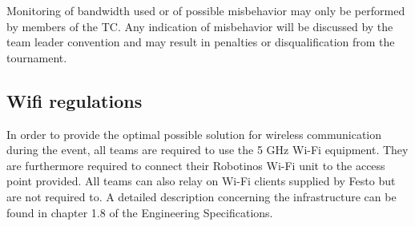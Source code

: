 \documentclass[12pt,twoside]{article}
\newenvironment{rulechange}{}{}
\begin{document}
Monitoring of bandwidth used or of possible misbehavior may only be
performed by members of the TC.
Any indication of misbehavior will be discussed by the team leader
convention and may result in penalties or disqualification from the
tournament.



\subsection{Wifi regulations}
\label{sec:wifi-regulations}
In order to provide the optimal possible solution for wireless
communication during the event, all teams are required to use the 5
GHz Wi-Fi equipment. They are furthermore required to connect their
Robotinos Wi-Fi unit to the access point provided. All teams can also
relay on Wi-Fi clients supplied by Festo but are not required to. A
detailed description concerning the infrastructure can be found in
chapter 1.8 of the Engineering Specifications.


\end{document}
